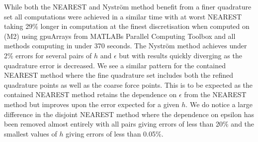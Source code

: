 While both the NEAREST and Nyström method benefit from a finer quadrature set all computations were achieved in a similar time with at worst NEAREST taking 29\% longer in computation at the finest discretisation when computed on (M2) using gpuArrays from MATLABs Parallel Computing Toolbox \cite{Gallagher2020} and all methods computing in under 370 seconds. The Nyström method achieves under 2\% errors for several pairs of $h$ and $\epsilon$ but with results quickly diverging as the quadrature error is decreased. We see a similar pattern for the contained NEAREST method where the fine quadrature set includes both the refined quadrature points as well as the coarse force points. This is to be expected as the contained NEAREST method retains the dependence on $\epsilon$ from the NEAREST method but improves upon the error expected for a given $h$. We do notice a large difference in the disjoint NEAREST method where the dependence on epsilon has been removed almost entirely with all pairs giving errors of less than 20\% and the smallest values of $h$ giving errors of less than 0.05\%. 
